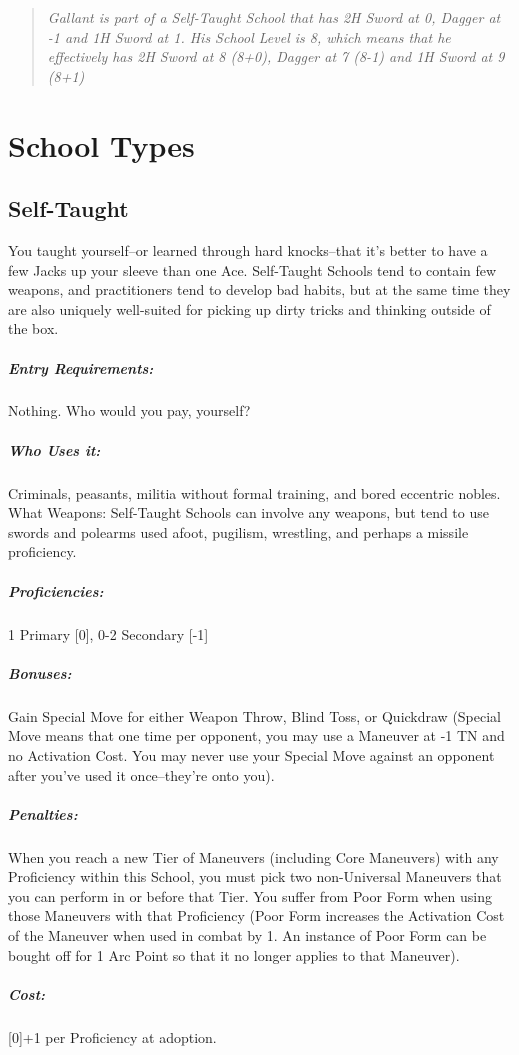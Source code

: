 \documentclass[oneside,11pt,english]{book}
\begin{document}
\begin{quote}
  \emph{Gallant is part of a Self-Taught School that has 2H Sword at 0, Dagger
    at -1 and 1H Sword at 1. His School Level is 8, which means that he
    effectively has 2H Sword at 8 (8+0), Dagger at 7 (8-1) and 1H Sword at 9
    (8+1)} 
\end{quote}

\section*{School Types}

\subsection{Self-Taught}
You taught yourself--or learned through hard knocks--that it’s better to have a few Jacks up your sleeve 
than one Ace. Self-Taught Schools tend to contain few weapons, and practitioners tend to develop bad 
habits, but at the same time they are also uniquely well-suited for picking up dirty tricks and thinking 
outside of the box. 

\vspace{-15pt}\subparagraph{Entry Requirements:} Nothing. Who would you pay, yourself?
\vspace{-15pt}\subparagraph{Who Uses it:} Criminals, peasants, militia without
formal training, and bored eccentric nobles. What Weapons: Self-Taught Schools
can involve any weapons, but tend to use swords and polearms used afoot,
pugilism, wrestling, and perhaps a missile proficiency. 
\vspace{-15pt}\subparagraph{Proficiencies:} 1 Primary [0], 0-2 Secondary [-1]
\vspace{-15pt}\subparagraph{Bonuses:} Gain Special Move for either Weapon Throw,
Blind Toss, or Quickdraw (Special Move means that one time per opponent, you may
use a Maneuver at -1 TN and no Activation Cost. You may never use your Special
Move against an opponent after you’ve used it once--they’re onto you).  
\vspace{-15pt}\subparagraph{Penalties:} When you reach a new Tier of Maneuvers
(including Core Maneuvers) with any Proficiency within this School, you must
pick two non-Universal Maneuvers that you can perform in or before that Tier.
You suffer from Poor Form when using those Maneuvers with that Proficiency (Poor
Form increases the Activation Cost of the Maneuver when used in combat by 1. An
instance of Poor Form can be bought off for 1 Arc Point so that it no longer
applies to that Maneuver). 
\vspace{-15pt}\subparagraph{Cost:} [0]+1 per Proficiency at adoption.
\end{document}
